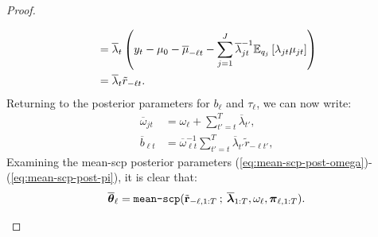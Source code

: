 \begin{proof}
\begin{enumerate}[label=\roman*.]
\begin{align*}
    &= \overline{\lambda}_{t}\left(y_t - \mu_0 - \overline{\mu}_{-\ell t} -  \sum_{j=1}^J\overline{\lambda}_{jt}^{-1} \mathbb{E}_{q_{j}}\left[\lambda_{jt}\mu_{jt}\right]\right) \\
    &=  \overline{\lambda}_{t} \tilde{r}_{-\ell t}.
\end{align*}
Returning to the posterior parameters for $b_{\ell}$ and $\tau_{\ell}$, we can now write: 
\begin{align*}
    \overline{\omega}_{jt} &=  \omega_{\ell} +  \sum_{t'=t}^{T} \overline{\lambda}_{t'}, \\
    \overline{b}_{\ell t}  &= \overline{\omega}_{\ell t}^{-1}  \sum_{t'=t}^{T} \overline{\lambda}_{t'}\tilde{r}_{-\ell t'},
\end{align*}
Examining the mean-scp posterior parameters (\ref{eq:mean-scp-post-omega})-(\ref{eq:mean-scp-post-pi}), it is clear that:
\begin{align*}
    \overline{\boldsymbol{\theta}}_\ell = \normalfont{\texttt{mean-scp}}(\tilde{\mathbf{r}}_{-\ell,1:T} \:;\: \overline{\boldsymbol{\lambda}}_{1:T}, \omega_{\ell}, \boldsymbol{\pi}_{\ell,1:T}).
\end{align*}


\end{enumerate}
\end{proof}
